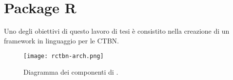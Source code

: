 
\chapter{Package R}
\label{cap:ctbnr}
Uno degli obiettivi di questo lavoro di tesi è consistito nella creazione di un framework in linguaggio  per le \acs{CTBN}.

\begin{figure}
	\centering
	\texttt{[image: rctbn-arch.png]}
	\caption[Diagramma dei componenti di \rctbn{}]{Diagramma dei componenti di \rctbn{}.}
	\label{fig:rctbncomponents}
\end{figure}








